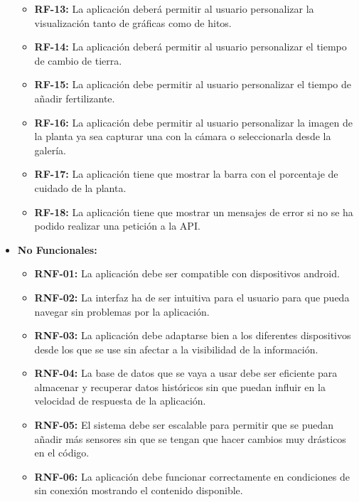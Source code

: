 \begin{itemize}
\begin{itemize}
            \item \textbf{RF-13:} La aplicación deberá permitir al usuario personalizar la visualización tanto de gráficas como de hitos.
            \item \textbf{RF-14:} La aplicación deberá permitir al usuario personalizar el tiempo de cambio de tierra.
            \item \textbf{RF-15:} La aplicación debe permitir al usuario personalizar el tiempo de añadir fertilizante.
            \item \textbf{RF-16:} La aplicación debe permitir al usuario personalizar la imagen de la planta ya sea capturar una con la cámara o seleccionarla desde la galería.
            \item \textbf{RF-17:} La aplicación tiene que mostrar la barra con el porcentaje de cuidado de la planta.
            \item \textbf{RF-18:} La aplicación tiene que mostrar un mensajes de error si no se ha podido realizar una petición a la API.
            


        \end{itemize}
    \item \textbf{No Funcionales:}
        \begin{itemize}
            \item \textbf{RNF-01:} La aplicación debe ser compatible con dispositivos android.
            \item \textbf{RNF-02:} La interfaz ha de ser intuitiva para el usuario para que pueda navegar sin problemas por la aplicación.
            \item \textbf{RNF-03:} La aplicación debe adaptarse bien a los diferentes dispositivos desde los que se use sin afectar a la visibilidad de la información.
            \item \textbf{RNF-04:} La base de datos que se vaya a usar debe ser eficiente para almacenar y recuperar datos históricos sin que puedan influir en la velocidad de respuesta de la aplicación.
            \item \textbf{RNF-05:} El sistema debe ser escalable para permitir que se puedan añadir más sensores sin que se tengan que hacer cambios muy drásticos en el código.
            \item \textbf{RNF-06:} La aplicación debe funcionar correctamente en condiciones de sin conexión mostrando el contenido disponible.
        \end{itemize}
\end{itemize}


